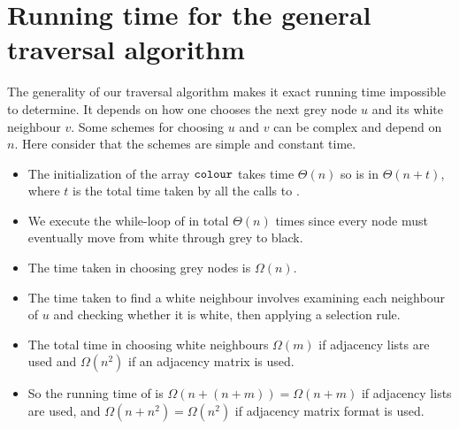 \section{Running time for the general traversal algorithm}

The generality of our traversal algorithm makes it exact running time impossible to determine.  
It depends on how one chooses the next grey node $u$ and its white neighbour $v$.  
Some schemes for choosing $u$ and $v$ can be complex and depend on $n$. 
Here consider that the schemes are simple and constant time. %


\begin{itemize}
\item The initialization of the array $\colour$ takes time 
$\Theta(n)$ so  
is in $\Theta(n + t)$, where $t$ is the total time taken by all 
the calls to .

\item We execute the while-loop of  in total $\Theta(n)$ times since every node
must eventually move from white through grey to black. 

\item The time taken in choosing grey nodes is
$\Omega(n)$. 

\item The time taken to find a white neighbour involves examining each  neighbour of $u$ and checking whether it is
white, then applying a selection rule. 

\item  The total time in choosing white neighbours $\Omega(m)$ if adjacency lists
are used and $\Omega(n^2)$ if an adjacency matrix is used.

\item So the running time of  is $\Omega(n + (n+m)) = \Omega(n + m)$
if adjacency lists are used, and $\Omega(n + n^2) = \Omega(n^2)$ if adjacency matrix format is used.

\end{itemize}


